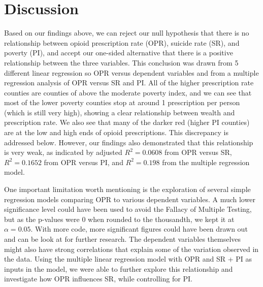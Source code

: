 \documentclass{article}
\newcommand{\<}{\langle}
\renewcommand{\>}{\rangle}
\theoremstyle{definition}
\begin{document}
\section*{Discussion}
\hspace{\parindent} Based on our findings above, we can reject our null hypothesis that there is no relationship between opioid prescription rate (OPR), suicide rate (SR), and poverty (PI), and accept our one-sided alternative that there is a positive relationship between the three variables. This conclusion was drawn from 5 different linear regression so OPR versus dependent variables and from a multiple regression analysis of OPR versus SR and PI. All of the higher prescription rate counties are counties of above the moderate poverty index, and we can see that most of the lower poverty counties stop at around 1 prescription per person (which is still very high), showing a clear relationship between wealth and prescription rate. We also see that many of the darker red (higher PI counties) are at the low and high ends of opioid prescriptions. This discrepancy is addressed below. However, our findings also demonstrated that this relationship is very weak, as indicated by adjusted $R^2 = 0.0608$ from OPR versus SR, $R^2 = 0.1652$ from OPR versus PI, and $R^2 = 0.198$ from the multiple regression model. 

One important limitation worth mentioning is the exploration of several simple regression models comparing OPR to various dependent variables. A much lower significance level could have been used to avoid the Fallacy of Multiple Testing, but as the p-values were 0 when rounded to the thousandth, we kept it at $\alpha = 0.05$. With more code, more significant figures could have been drawn out and can be look at for further research. The dependent variables themselves might also have strong correlations that explain some of the variation observed in the data.  Using the multiple linear regression model with OPR and SR + PI as inputs in the model, we were able to further explore this relationship and investigate how OPR influences SR, while controlling for PI.
\end{document}
